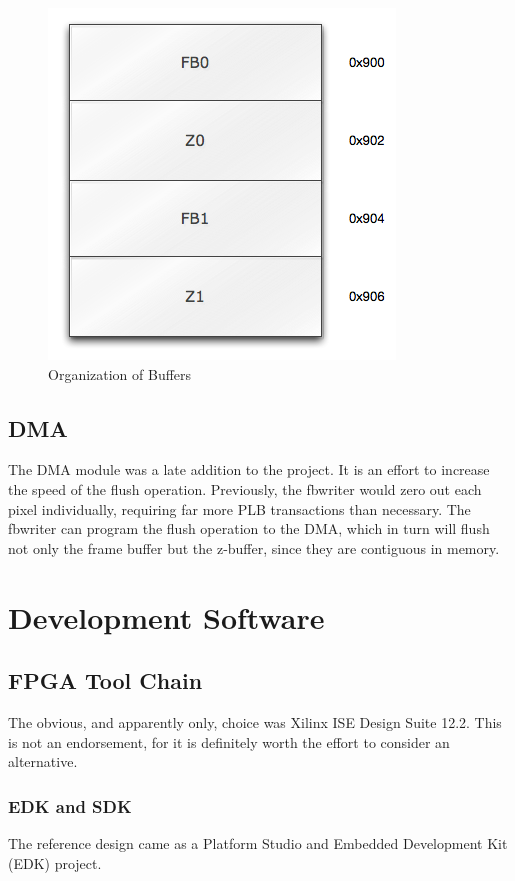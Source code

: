 \documentclass[letterpaper,10pt]{article}
\begin{document}
\begin{figure}[htb]
\begin{center}
\includegraphics[scale=.68]{buffer_space.png}
\end{center}
\caption{Organization of Buffers}
\label{fig:buffer_space}
\end{figure}

\subsection{DMA}
The DMA module was a late addition to the project.  It is an effort to increase the speed of the flush operation.  Previously, the fbwriter would zero out each pixel individually, requiring far more PLB transactions than necessary.  The fbwriter can program the flush operation to the DMA, which in turn will flush not only the frame buffer but the z-buffer, since they are contiguous in memory.

\section{Development Software}

\subsection{FPGA Tool Chain}
The obvious, and apparently only, choice was Xilinx ISE Design Suite 12.2.  This is not an endorsement, for it is definitely worth the effort to consider an alternative.

\subsubsection{EDK and SDK}
The reference design came as a Platform Studio and Embedded Development Kit (EDK) project.  
\end{document}
